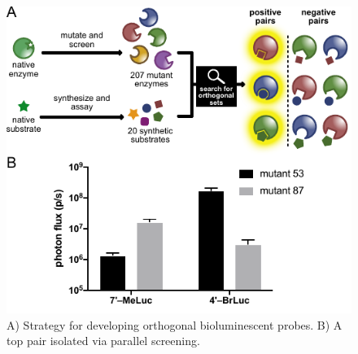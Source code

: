 \documentclass[11pt]{article}
\begin{document}
\begin{figure}
\begin{centering}
\includegraphics[width=\textwidth]{figures/algorithm_v5.pdf}

\end{centering}
\footnotesize
\caption{\label{figure:algorithm}
A) Strategy for developing orthogonal bioluminescent probes. B) A top pair isolated via parallel screening.
}
\end{figure}
\end{document}
